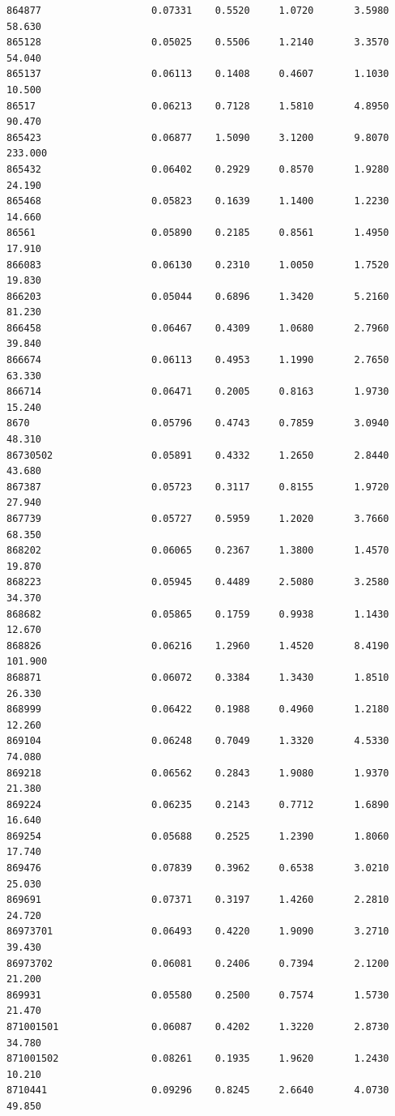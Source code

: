 \documentclass[
  letterpaper,
  DIV=11,
  numbers=noendperiod]{scrartcl}
\begin{document}
\begin{verbatim}
864877                   0.07331    0.5520     1.0720       3.5980  58.630
865128                   0.05025    0.5506     1.2140       3.3570  54.040
865137                   0.06113    0.1408     0.4607       1.1030  10.500
86517                    0.06213    0.7128     1.5810       4.8950  90.470
865423                   0.06877    1.5090     3.1200       9.8070 233.000
865432                   0.06402    0.2929     0.8570       1.9280  24.190
865468                   0.05823    0.1639     1.1400       1.2230  14.660
86561                    0.05890    0.2185     0.8561       1.4950  17.910
866083                   0.06130    0.2310     1.0050       1.7520  19.830
866203                   0.05044    0.6896     1.3420       5.2160  81.230
866458                   0.06467    0.4309     1.0680       2.7960  39.840
866674                   0.06113    0.4953     1.1990       2.7650  63.330
866714                   0.06471    0.2005     0.8163       1.9730  15.240
8670                     0.05796    0.4743     0.7859       3.0940  48.310
86730502                 0.05891    0.4332     1.2650       2.8440  43.680
867387                   0.05723    0.3117     0.8155       1.9720  27.940
867739                   0.05727    0.5959     1.2020       3.7660  68.350
868202                   0.06065    0.2367     1.3800       1.4570  19.870
868223                   0.05945    0.4489     2.5080       3.2580  34.370
868682                   0.05865    0.1759     0.9938       1.1430  12.670
868826                   0.06216    1.2960     1.4520       8.4190 101.900
868871                   0.06072    0.3384     1.3430       1.8510  26.330
868999                   0.06422    0.1988     0.4960       1.2180  12.260
869104                   0.06248    0.7049     1.3320       4.5330  74.080
869218                   0.06562    0.2843     1.9080       1.9370  21.380
869224                   0.06235    0.2143     0.7712       1.6890  16.640
869254                   0.05688    0.2525     1.2390       1.8060  17.740
869476                   0.07839    0.3962     0.6538       3.0210  25.030
869691                   0.07371    0.3197     1.4260       2.2810  24.720
86973701                 0.06493    0.4220     1.9090       3.2710  39.430
86973702                 0.06081    0.2406     0.7394       2.1200  21.200
869931                   0.05580    0.2500     0.7574       1.5730  21.470
871001501                0.06087    0.4202     1.3220       2.8730  34.780
871001502                0.08261    0.1935     1.9620       1.2430  10.210
8710441                  0.09296    0.8245     2.6640       4.0730  49.850

\end{verbatim}
\end{document}
